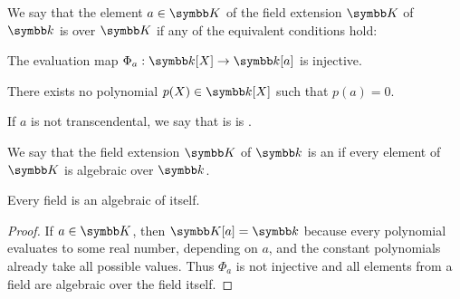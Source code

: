 \begin{definition}\label{def:transcendetal_element}\cite[454]{Knapp2016BAlg}
  We say that the element \( a \in \K \) of the field extension \( \K \) of \( \k \) is  over \( \K \) if any of the equivalent conditions hold:
  \begin{defenum}
     The evaluation map \( \Phi_a: \k[X] \to \k[a] \) is injective.

     There exists no polynomial \( p(X) \in \k[X] \) such that \( p(a) = 0 \).
  \end{defenum}

  If \( a \) is not transcendental, we say that is is .
\end{definition}

\begin{definition}\label{def:algebraic_extension}\cite[456]{Knapp2016BAlg}
  We say that the field extension \( \K \) of \( \k \) is an  if every element of \( \K \) is algebraic over \( \k \).
\end{definition}

\begin{proposition}\label{thm:field_elements_are_algebraic}
  Every field is an algebraic of itself.
\end{proposition}
\begin{proof}
  If \( a \in \K \), then \( \K[a] = \k \) because every polynomial evaluates to some real number, depending on \( a \), and the constant polynomials already take all possible values. Thus \( \Phi_a \) is not injective and all elements from a field are algebraic over the field itself.
\end{proof}

